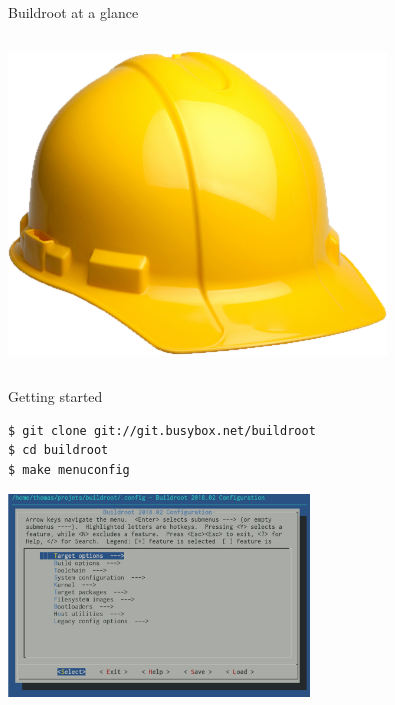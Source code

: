 \documentclass[aspectratio=169,obeyspaces,spaces,hyphens,dvipsnames]{beamer}
\begin{document}
\begin{frame}{Buildroot at a glance}
\begin{columns}
  \includegraphics[width=\textwidth]{logo.png}
\end{columns}
\end{frame}

\begin{frame}[fragile]{Getting started}
  \begin{block}{}
    \begin{verbatim}
$ git clone git://git.busybox.net/buildroot
$ cd buildroot
$ make menuconfig
\end{verbatim}
  \end{block}
  \vspace{0.1cm}
  \begin{center}
    \includegraphics[width=0.6\textwidth]{buildroot-screenshot.png}
  \end{center}
\end{frame}
\end{document}
